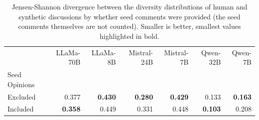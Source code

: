 \begin{table}[ht]
\caption{Jensen-Shannon divergence between the diversity distributions  of human and synthetic discussions by whether seed comments were provided (the seed comments themselves are not counted). Smaller is better, smallest values highlighted in bold.}
\label{tab:divergence-initialization}
\begin{tabular}{lrrrrrr}
\toprule
& LLaMa-70B & LLaMa-8B & Mistral-24B & Mistral-7B & Qwen-32B & Qwen-7B \\
Seed Opinions &  &  &  &  &  &  \\
\midrule
Excluded & 0.377 & \textbf{0.430} & \textbf{0.280} & \textbf{0.429} & 0.133 & \textbf{0.163} \\
Included & \textbf{0.358} & 0.449 & 0.331 & 0.448 & \textbf{0.103} & 0.208 \\
\bottomrule
\end{tabular}
\end{table}
